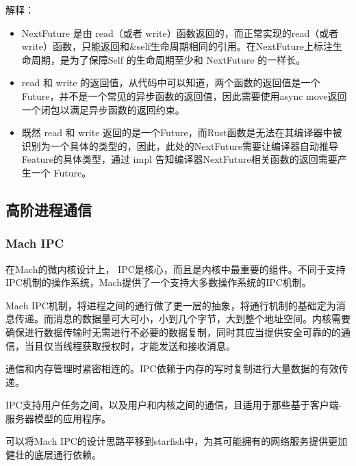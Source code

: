 解释：

\begin{itemize}
    \item NextFuture 是由 read（或者 write）函数返回的，而正常实现的read（或者 write）函数，只能返回和\&self生命周期相同的引用。在NextFuture上标注生命周期，是为了保障Self 的生命周期至少和 NextFuture 的一样长。
    \item read 和 write 的返回值，从代码中可以知道，两个函数的返回值是一个 Future，并不是一个常见的异步函数的返回值，因此需要使用async move返回一个闭包以满足异步函数的返回约束。
    \item 既然 read 和 write 返回的是一个Future，而Rust函数是无法在其编译器中被识别为一个具体的类型的，因此，此处的NextFuture需要让编译器自动推导Feature的具体类型，通过 impl 告知编译器NextFuture相关函数的返回需要产生一个	Future。
\end{itemize}

\subsection{高阶进程通信}


\subsubsection*{Mach IPC}


在Mach的微内核设计上， IPC是核心，而且是内核中最重要的组件。不同于支持IPC机制的操作系统，Mach提供了一个支持大多数操作系统的IPC机制。

Mach IPC机制，将进程之间的通行做了更一层的抽象，将通行机制的基础定为消息传递。而消息的数据量可大可小，小到几个字节，大到整个地址空间。内核需要确保进行数据传输时无需进行不必要的数据复制，同时其应当提供安全可靠的的通信，当且仅当线程获取授权时，才能发送和接收消息。

通信和内存管理时紧密相连的。IPC依赖于内存的写时复制进行大量数据的有效传递。

IPC支持用户任务之间，以及用户和内核之间的通信，且适用于那些基于客户端-服务器模型的应用程序。

可以将Mach IPC的设计思路平移到starfish中，为其可能拥有的网络服务提供更加健壮的底层通行依赖。